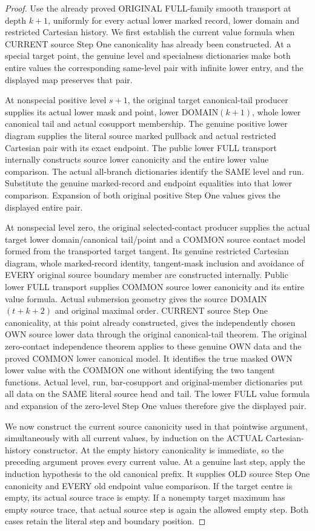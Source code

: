 \begin{proof}
Use the already proved ORIGINAL FULL-family smooth transport at depth
$k+1$, uniformly for every actual lower marked record, lower domain and
restricted Cartesian history. We first establish the current value formula
when CURRENT source Step One canonicality has already been constructed.
At a special target point, the genuine level and specialness dictionaries
make both entire values the corresponding same-level pair with infinite
lower entry, and the displayed map preserves that pair.

At nonspecial positive level $s+1$, the original target canonical-tail
producer supplies its actual lower mask and point, lower DOMAIN$(k+1)$,
whole lower canonical tail and actual cosupport membership. The genuine
positive lower diagram supplies the literal source marked pullback and
actual restricted Cartesian pair with its exact endpoint. The public
lower FULL transport internally constructs source lower canonicity and
the entire lower value comparison. The actual all-branch dictionaries
identify the SAME level and run. Substitute the genuine marked-record
and endpoint equalities into that lower comparison. Expansion of both
original positive Step One values gives the displayed entire pair.

At nonspecial level zero, the original selected-contact producer supplies
the actual target lower domain/canonical tail/point and a COMMON source
contact model formed from the transported target tangent. Its genuine
restricted Cartesian diagram, whole marked-record identity, tangent-mask
inclusion and avoidance of EVERY original source boundary member are
constructed internally. Public lower FULL transport supplies COMMON
source lower canonicity and its entire value formula. Actual submersion
geometry gives the source DOMAIN$(t+k+2)$ and original maximal order.
CURRENT source Step One canonicality, at this point already constructed,
gives the independently chosen OWN source lower data through the original
canonical-tail theorem. The original zero-contact independence theorem
applies to these genuine OWN data and the proved COMMON lower canonical
model. It identifies the true masked OWN lower value with the COMMON
one without identifying the two tangent functions. Actual level, run,
bar-cosupport and original-member dictionaries put all data on the SAME
literal source head and tail. The lower FULL value formula and expansion
of the zero-level Step One values therefore give the displayed pair.

We now construct the current source canonicity used in that pointwise
argument, simultaneously with all current values, by induction on the
ACTUAL Cartesian-history constructor. At the empty history canonicality
is immediate, so the preceding argument proves every current value.
At a genuine last step, apply the induction hypothesis to the old
canonical prefix. It supplies OLD source Step One canonicity and EVERY
old endpoint value comparison. If the target centre is empty, its actual
source trace is empty. If a nonempty target maximum has empty source
trace, that actual source step is again the allowed empty step. Both
cases retain the literal step and boundary position.


\end{proof}
